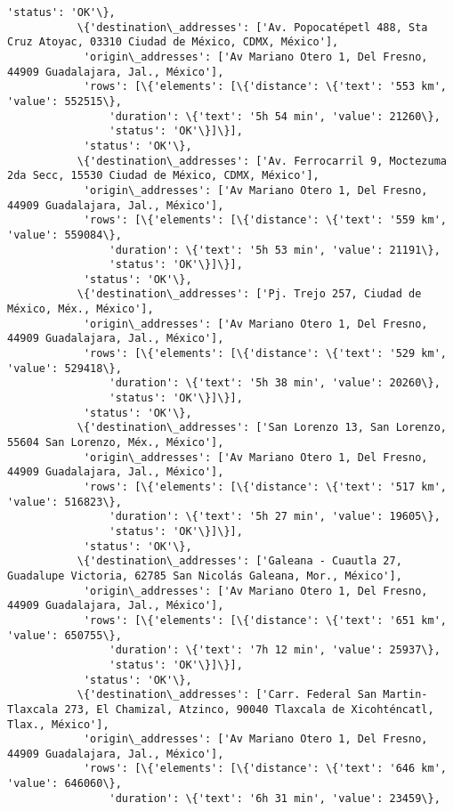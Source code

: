 \documentclass[11pt]{article}
\begin{document}
\begin{Verbatim}[commandchars=\\\{\}]
            'status': 'OK'\},
           \{'destination\_addresses': ['Av. Popocatépetl 488, Sta Cruz Atoyac, 03310 Ciudad de México, CDMX, México'],
            'origin\_addresses': ['Av Mariano Otero 1, Del Fresno, 44909 Guadalajara, Jal., México'],
            'rows': [\{'elements': [\{'distance': \{'text': '553 km', 'value': 552515\},
                'duration': \{'text': '5h 54 min', 'value': 21260\},
                'status': 'OK'\}]\}],
            'status': 'OK'\},
           \{'destination\_addresses': ['Av. Ferrocarril 9, Moctezuma 2da Secc, 15530 Ciudad de México, CDMX, México'],
            'origin\_addresses': ['Av Mariano Otero 1, Del Fresno, 44909 Guadalajara, Jal., México'],
            'rows': [\{'elements': [\{'distance': \{'text': '559 km', 'value': 559084\},
                'duration': \{'text': '5h 53 min', 'value': 21191\},
                'status': 'OK'\}]\}],
            'status': 'OK'\},
           \{'destination\_addresses': ['Pj. Trejo 257, Ciudad de México, Méx., México'],
            'origin\_addresses': ['Av Mariano Otero 1, Del Fresno, 44909 Guadalajara, Jal., México'],
            'rows': [\{'elements': [\{'distance': \{'text': '529 km', 'value': 529418\},
                'duration': \{'text': '5h 38 min', 'value': 20260\},
                'status': 'OK'\}]\}],
            'status': 'OK'\},
           \{'destination\_addresses': ['San Lorenzo 13, San Lorenzo, 55604 San Lorenzo, Méx., México'],
            'origin\_addresses': ['Av Mariano Otero 1, Del Fresno, 44909 Guadalajara, Jal., México'],
            'rows': [\{'elements': [\{'distance': \{'text': '517 km', 'value': 516823\},
                'duration': \{'text': '5h 27 min', 'value': 19605\},
                'status': 'OK'\}]\}],
            'status': 'OK'\},
           \{'destination\_addresses': ['Galeana - Cuautla 27, Guadalupe Victoria, 62785 San Nicolás Galeana, Mor., México'],
            'origin\_addresses': ['Av Mariano Otero 1, Del Fresno, 44909 Guadalajara, Jal., México'],
            'rows': [\{'elements': [\{'distance': \{'text': '651 km', 'value': 650755\},
                'duration': \{'text': '7h 12 min', 'value': 25937\},
                'status': 'OK'\}]\}],
            'status': 'OK'\},
           \{'destination\_addresses': ['Carr. Federal San Martin-Tlaxcala 273, El Chamizal, Atzinco, 90040 Tlaxcala de Xicohténcatl, Tlax., México'],
            'origin\_addresses': ['Av Mariano Otero 1, Del Fresno, 44909 Guadalajara, Jal., México'],
            'rows': [\{'elements': [\{'distance': \{'text': '646 km', 'value': 646060\},
                'duration': \{'text': '6h 31 min', 'value': 23459\},

\end{Verbatim}
\end{document}
